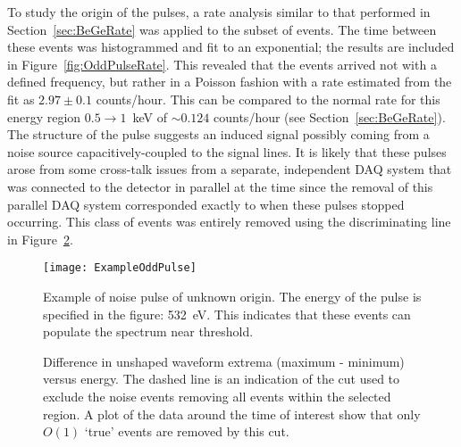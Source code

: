 	To study the origin of the pulses, a rate analysis similar to that performed in Section~\ref{sec:BeGeRate} was applied to the subset of events.  The time between these events was histogrammed and fit to an exponential; the results are included in Figure~\ref{fig:OddPulseRate}.  This revealed that the events arrived not with a defined frequency, but rather in a Poisson fashion with a rate estimated from the fit as $2.97 \pm 0.1$ counts/hour.  This can be compared to the normal rate for this energy region $0.5\to1$~keV of $\sim0.124$ counts/hour (see Section~\ref{sec:BeGeRate}).  The structure of the pulse suggests an induced signal possibly coming from a noise source capacitively-coupled to the signal lines.  It is likely that these pulses arose from some cross-talk issues from a separate, independent DAQ system that was connected to the detector in parallel at the time since the removal of this parallel DAQ system corresponded exactly to when these pulses stopped occurring.  This class of events was entirely removed using the discriminating line in Figure~\ref{fig:OddPulseCut}.
	
	
			\begin{figure}
				\centering
				\texttt{[image: ExampleOddPulse]}
				\caption[Example of noise pulse of unknown origin]
				{Example of noise pulse of unknown origin.  The energy of the pulse is specified in the figure: 532~eV. 
				This indicates that these events can populate the spectrum near threshold.}
				\label{fig:OddPulseExample}
			\end{figure}	

			\begin{figure}
				\centering
				\def\plotwidth{0.76\textwidth}
				\caption[Difference in unshaped waveform extrema versus energy]
				{Difference in unshaped waveform extrema (maximum - minimum) versus energy.  The dashed line is an indication of the cut used to exclude the 
				noise events removing all events within the selected region.  A plot of the data around the time of interest
				show that only $O(1)$ `true' events are removed by this cut.  }
				\label{fig:OddPulseCut}
			\end{figure}

